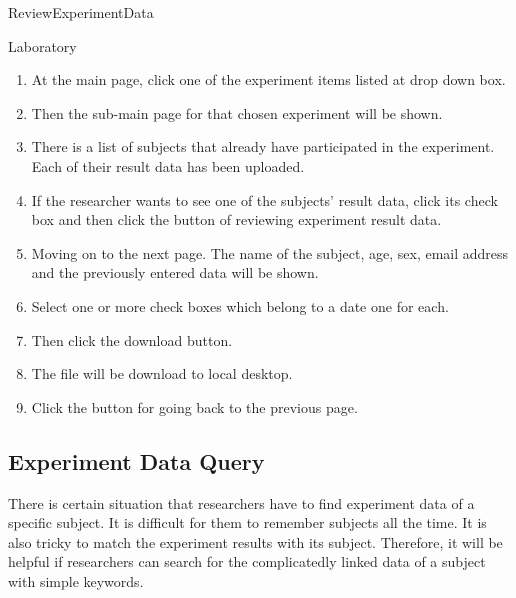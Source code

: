 \documentclass[letterpaper, 10 pt, conference]{ieeeconf}  %
\begin{document}
ReviewExperimentData\\

Laboratory\\

\begin{enumerate}
    \item At the main page, click one of the experiment items listed at drop down box.
    \item Then the sub-main page for that chosen experiment will be shown.
\item There is a list of subjects that already have participated in the experiment. Each of their result data has been uploaded. 
\item If the researcher wants to see one of the subjects' result data, click its check box and then click the button of reviewing experiment result data. 
\item Moving on to the next page. The name of the subject, age, sex, email address and the previously entered data will be shown. 
\item Select one or more check boxes which belong to a date one for each. 
\item Then click the download button.
\item The file will be download to local desktop.
\item Click the button for going back to the previous page.
\end{enumerate}
    
    
\subsection{Experiment Data Query}
There is certain situation that researchers have to find experiment data of a specific subject. It is difficult for them to remember subjects all the time. It is also tricky to match the experiment results with its subject. Therefore, it will be helpful if researchers can search for the complicatedly linked data of a subject with simple keywords. \\
\end{document}
